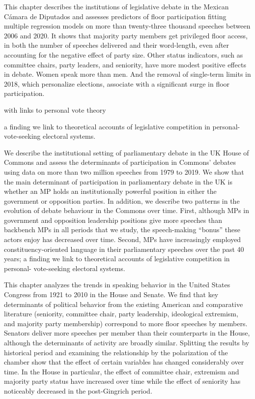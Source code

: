 This chapter describes the institutions of legislative debate in the Mexican Cámara de Diputados and
assesses predictors of floor participation fitting multiple regression models on more than twenty-three thousand speeches between 2006 and 2020. It shows that majority party members get privileged floor access, in both the number of speeches delivered and their word-length, even after accounting for the negative effect of party size. Other status indicators, such as committee chairs, party leaders, and seniority, have more modest positive effects in debate. Women speak more than men. And the removal of single-term limits in 2018, which personalize elections, associate with a significant surge in floor participation. 

with links to personal vote theory

a finding we link to theoretical accounts of legislative competition in personal-
vote-seeking electoral systems.

 

We describe the institutional setting of parliamentary debate in the UK House of Commons and
assess the determinants of participation in Commons’ debates using data on more than two
million speeches from 1979 to 2019. We show that the main determinant of participation in
parliamentary debate in the UK is whether an MP holds an institutionally powerful position in
either the government or opposition parties. In addition, we describe two patterns in the
evolution of debate behaviour in the Commons over time. First, although MPs in government
and opposition leadership positions give more speeches than backbench MPs in all periods that
we study, the speech-making “bonus” these actors enjoy has decreased over time. Second, MPs
have increasingly employed constituency-oriented language in their parliamentary speeches over
the past 40 years; a finding we link to theoretical accounts of legislative competition in personal-
vote-seeking electoral systems.

This chapter analyzes the trends in speaking behavior in the United States Congress from 1921 to
2010 in the House and Senate. We find that key determinants of political behavior from the
existing American and comparative literature (seniority, committee chair, party leadership,
ideological extremism, and majority party membership) correspond to more floor speeches by
members. Senators deliver more speeches per member than their counterparts in the House,
although the determinants of activity are broadly similar. Splitting the results by historical period
and examining the relationship by the polarization of the chamber show that the effect of certain
variables has changed considerably over time. In the House in particular, the effect of committee
chair, extremism and majority party status have increased over time while the effect of seniority
has noticeably decreased in the post-Gingrich period.

